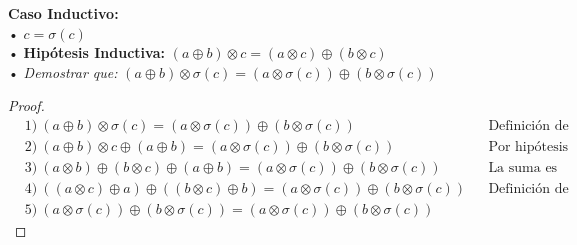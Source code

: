 \documentclass[11pt,letterpaper]{article}
\begin{document}
\begin{enumerate}
\vspace{0.1cm}

\noindent \textbf{\large Caso Inductivo:}\\
\noindent • $c=\sigma(c)$ \\
\noindent • \textbf{Hipótesis Inductiva: } $(a\oplus b)\otimes c = (a\otimes c) \oplus (b \otimes c)$ \\
\noindent • \emph{Demostrar que:} $(a\oplus b)\otimes \sigma(c) = (a\otimes \sigma(c)) \oplus (b \otimes \sigma(c))$

\begin{proof}
\begin{align*}
&1)\ (a\oplus b)\otimes \sigma(c) = (a\otimes \sigma(c)) \oplus (b \otimes \sigma(c)) && \text{Definición de la multiplicación.} \\
&2)\ (a \oplus b) \otimes c \oplus (a \oplus b) = (a\otimes \sigma(c)) \oplus (b \otimes \sigma(c)) && \text{Por hipótesis de inducción.} \\
&3)\ (a \otimes b) \oplus (b \otimes c) \oplus (a \oplus b) = (a\otimes \sigma(c)) \oplus (b \otimes \sigma(c)) && \text{La suma es asociativa y conmutativa.} \\
&4)\ ((a \otimes c) \oplus a) \oplus ((b \otimes c) \oplus b) = (a\otimes \sigma(c)) \oplus (b \otimes \sigma(c)) && \text{Definición de la multiplicación.} \\
&5)\ (a \otimes \sigma(c)) \oplus (b \otimes \sigma(c)) = (a\otimes \sigma(c)) \oplus (b \otimes \sigma(c))
\end{align*}
\end{proof}

\end{enumerate}
\end{document}
